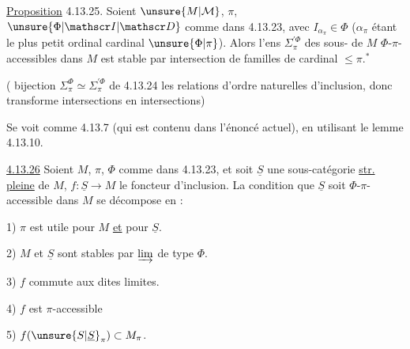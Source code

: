 
\uline{Proposition} 4.13.25. Soient $\unsure{M|\mathcal M}$, $\pi$, $\unsure{\Phi|\mathscr I|\mathscr D}$ comme dans 4.13.23, avec $I_{\alpha_\pi}\in\Phi$ ($\alpha_\pi$ étant le plus petit ordinal  cardinal $\unsure{\Phi|\pi}$). Alors l'ens $\Sigma_\pi^{\prime\Phi}$ des sous- de $M$ $\Phi$-$\pi$-accessibles dans $M$ est stable par intersection de familles de cardinal $\leq\pi$.$^{*}$


 (  bijection $\Sigma_\pi^\Phi\simeq\Sigma_\pi^{\prime\Phi}$ de 4.13.24  les relations d'ordre naturelles d'inclusion, donc transforme intersections en intersections)

Se voit comme 4.13.7 (qui est contenu dans l'énoncé actuel), en utilisant le lemme 4.13.10.

\uline{4.13.26} Soient $M$, $\pi$, $\Phi$ comme dans 4.13.23, et soit $\underline S$ une sous-catégorie \uline{str. pleine} de $M$, $f:\underline S\to M$ le foncteur d'inclusion.  La condition que $\underline S$ soit $\Phi$-$\pi$-accessible dans $M$ se décompose en :

1) $\pi$ est utile pour $M$ \uline{et} pour $\underline S$.

2) $M$ et $\underline S$ sont stables par $\varinjlim$ de type $\Phi$.

3) $f$ commute aux dites limites.

4) $f$ est $\pi$-accessible

5) $f(\unsure{S|\underline S}_\pi)\subset M_\pi$.


